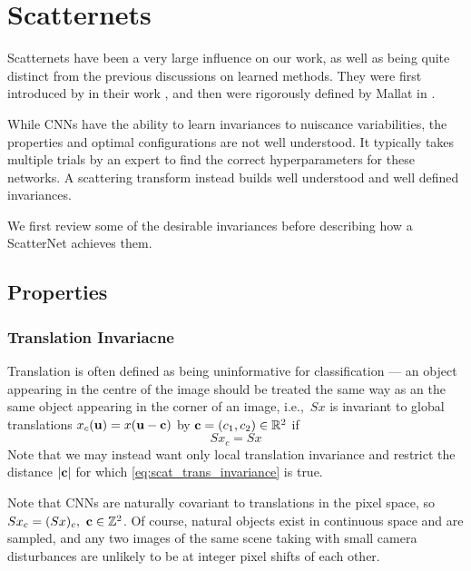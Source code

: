 \section{Scatternets}\label{ch:scatternets}
  Scatternets have been a very large influence on
  our work, as well as being quite distinct from the previous discussions on
  learned methods. They were first introduced by  
  \citeauthor{bruna_classification_2011} in their work 
  \cite{bruna_classification_2011}, and then were rigorously defined by Mallat
  in \cite{mallat_group_2012}.   

  While CNNs have the ability to learn invariances to nuiscance variabilities, 
  the properties and optimal configurations are not well understood. 
  It typically takes multiple trials
  by an expert to find the correct hyperparameters for these networks. A
  scattering transform instead builds well understood and well defined invariances. 
  
  We first review some of the desirable invariances before describing how a
  ScatterNet achieves them.

\subsection{Properties}
\subsubsection{Translation Invariacne}
  Translation is often defined as being uninformative for classification --- an
  object appearing in the centre of the image should be treated the same way as
  an the same object appearing in the corner of an image, i.e.,\ $S x$ is
  invariant to global translations $x_c(\mathbf{u}) = x(\mathbf{u}-\mathbf{c})$ by 
  $\mathbf{c}=(c_1,c_2) \in \mathbb{R}^2$ if
  \begin{equation}\label{eq:scat_trans_invariance}
    S x_c = S x
  \end{equation}
  Note that we may instead want only local translation invariance and
  restrict the distance $|\mathbf{c}|$ for which \eqref{eq:scat_trans_invariance}
  is true. 
  
  Note that CNNs are naturally covariant to translations in the pixel space, 
  so $Sx_c = (Sx)_c,\ \mathbf{c} \in \mathbb{Z}^2$. Of course, natural objects
  exist in continuous space and are sampled, and any two images of the same
  scene taking with small camera disturbances are unlikely to be at integer pixel 
  shifts of each other.

